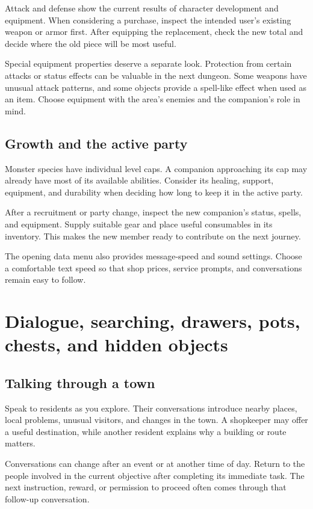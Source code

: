 Attack and defense show the current results of character development and
equipment. When considering a purchase, inspect the intended user's
existing weapon or armor first. After equipping the replacement, check
the new total and decide where the old piece will be most useful.

Special equipment properties deserve a separate look. Protection from
certain attacks or status effects can be valuable in the next dungeon.
Some weapons have unusual attack patterns, and some objects provide a
spell-like effect when used as an item. Choose equipment with the area's
enemies and the companion's role in mind.

\subsection*{Growth and the active party}

Monster species have individual level caps. A companion approaching its
cap may already have most of its available abilities. Consider its healing,
support, equipment, and durability when deciding how long to keep it in
the active party.

After a recruitment or party change, inspect the new companion's status,
spells, and equipment. Supply suitable gear and place useful consumables
in its inventory. This makes the new member ready to contribute on the
next journey.

The opening data menu also provides message-speed and sound settings.
Choose a comfortable text speed so that shop prices, service prompts,
and conversations remain easy to follow.

\section{Dialogue, searching, drawers, pots, chests, and hidden objects}

\subsection*{Talking through a town}

Speak to residents as you explore. Their conversations introduce nearby
places, local problems, unusual visitors, and changes in the town. A
shopkeeper may offer a useful destination, while another resident explains
why a building or route matters.

Conversations can change after an event or at another time of day. Return
to the people involved in the current objective after completing its
immediate task. The next instruction, reward, or permission to proceed
often comes through that follow-up conversation.

